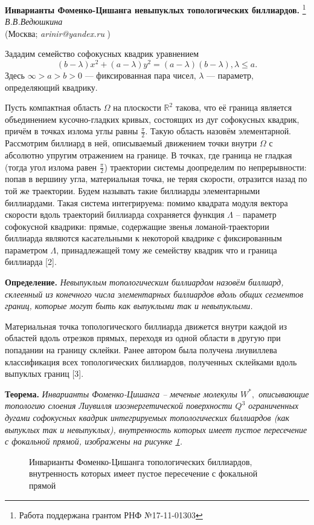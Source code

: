 \begin{center}{ \bf   Инварианты Фоменко-Цишанга невыпуклых топологических биллиардов.}%
\footnote{Работа поддержана грантом РНФ №17-11-01303}\\
 {\it В.В.Ведюшкина } \\
(Москва; {\it arinir@yandex.ru} )

\end{center}

Зададим семейство софокусных квадрик уравнением
$$(b-\lambda)x^2+(a-\lambda)y^2=(a-\lambda)(b-\lambda),   \lambda\leqslant a.    $$
Здесь $\infty> a> b>0$ --- фиксированная   пара чисел, $\lambda$ ---
параметр, определяющий квадрику.

Пусть  компактная область $\Omega$  на плоскости $\mathbb{R}^2$  такова, что её граница  является объединением кусочно-гладких кривых, состоящих из дуг софокусных квадрик, причём в точках излома  углы равны $\frac{\pi}{2}$. Такую область назовём элементарной.
Рассмотрим   биллиард  в ней, описываемый движением   точки внутри  $\Omega$ с
абсолютно упругим отражением на границе. В точках,
где граница   не гладкая
(тогда   угол излома  равен $\frac{\pi}{2}$)
 траектории системы  доопределим по непрерывности:  попав в вершину угла, материальная точка, не теряя скорости, отразится назад по той же траектории.  Будем называть такие биллиарды элементарными биллиардами.
 Такая система   интегрируема: помимо квадрата модуля вектора скорости   вдоль траекторий биллиарда сохраняется функция $\Lambda$ -- параметр софокусной квадрики: прямые, содержащие звенья ломаной-траектории биллиарда являются касательными к некоторой квадрике с фиксированным параметром $\Lambda$, принадлежащей тому же семейству квадрик что и граница биллиарда [2].

\textbf{Определение.}
{\it Невыпуклым  топологическим   биллиардом   назовём биллиард,  склеенный из конечного числа элементарных биллиардов вдоль общих   сегментов границ, которые могут быть как выпуклыми так и невыпуклыми.}

Материальная точка  топологического биллиарда движется внутри каждой из областей вдоль отрезков прямых, переходя из одной области в другую при попадании на границу склейки. Ранее автором была получена лиувиллева классификация всех  топологических биллиардов, полученных склейками вдоль выпуклых границ [3].

\textbf{Теорема.}
{\it Инварианты Фоменко-Цишанга -- меченые молекулы $W^*,$ описывающие топологию слоения Лиувилля изоэнергетической поверхности $Q^3$ ограниченных дугами софокусных квадрик интегрируемых топологических    биллиардов (как выпуклых так и невыпуклых),  внутренность которых имеет пустое пересечение с фокальной прямой,   изображены на рисунке \ref{moleculesSimple}.
 }
 \begin{figure}[h!]

\caption{Инварианты Фоменко-Цишанга топологических    биллиардов, внутренность которых имеет пустое пересечение с фокальной прямой}\label{moleculesSimple}
 \end{figure}


